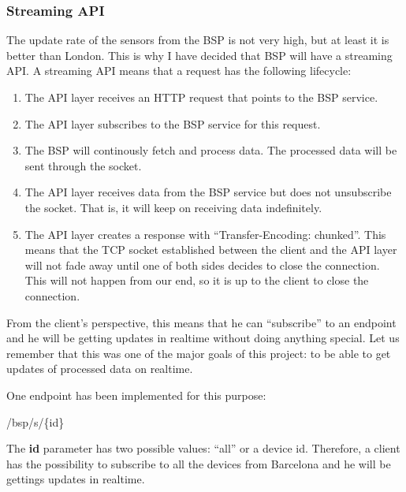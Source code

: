 \subsubsection*{Streaming \ac{API}}

The update rate of the sensors from the \ac{BSP} is not very high, but at least
it is better than London. This is why I have decided that \ac{BSP} will have a
streaming \ac{API}. A streaming \ac{API} means that a request has the following
lifecycle:

\begin{enumerate}
  \itemsep0em
  \item The \ac{API} layer receives an HTTP request that points to the \ac{BSP}
service.
  \item The \ac{API} layer subscribes to the \ac{BSP} service for this request.
  \item The \ac{BSP} will continously fetch and process data. The processed data
will be sent through the socket.
  \item The \ac{API} layer receives data from the \ac{BSP} service but does not
unsubscribe the socket. That is, it will keep on receiving data indefinitely.
  \item The \ac{API} layer creates a response with ``Transfer-Encoding:
chunked''.
This means that the TCP socket established between the client and the \ac{API}
layer will not fade away until one of both sides decides to close the
connection. This will not happen from our end, so it is up to the client to
close the connection.
\end{enumerate}

From the client's perspective, this means that he can ``subscribe'' to an
endpoint and he will be getting updates in realtime without doing anything
special. Let us remember that this was one of the major goals of this project:
to be able to get updates of processed data on realtime.

One endpoint has been implemented for this purpose:

\begin{center}
  /bsp/s/\{id\}
\end{center}

The {\bf id} parameter has two possible values: ``all'' or a device id.
Therefore, a client has the possibility to subscribe to all the devices from
Barcelona and he will be gettings updates in realtime.
